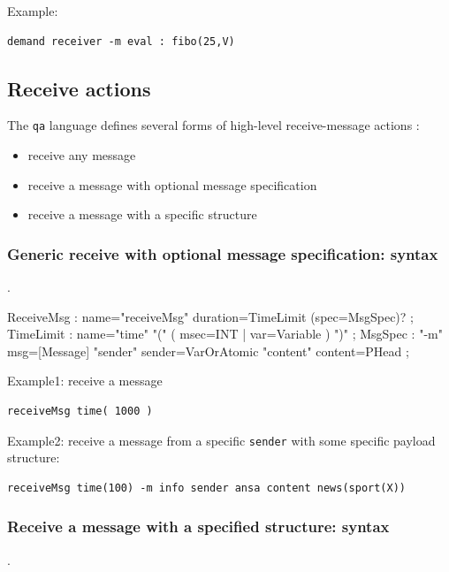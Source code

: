 \noindent Example:
\begin{Verbatim}[fontsize=\scriptsize, frame=single]
demand receiver -m eval : fibo(25,V)   
\end{Verbatim}

 
\subsection{Receive actions}
 
The \texttt{qa} language defines several forms of high-level receive-message actions  : 

\begin{itemize}
\item receive any message
\item receive a message with optional message specification
\item receive a message with a specific structure
\end{itemize}

\subsubsection{Generic receive with optional message specification: syntax}.
\begin{javacode}  
ReceiveMsg : name="receiveMsg" duration=TimeLimit (spec=MsgSpec)? ;
	TimeLimit : name="time" "(" ( msec=INT | var=Variable ) ")" ;
	MsgSpec   : "-m" msg=[Message]  "sender" sender=VarOrAtomic "content" content=PHead ; 
\end{javacode}

\noindent Example1: receive a message
\begin{Verbatim}[fontsize=\scriptsize, frame=single]
receiveMsg time( 1000 )   
\end{Verbatim}	

\noindent Example2: receive a message  from a specific \texttt{sender} with some specific payload structure:
 \begin{Verbatim}[fontsize=\scriptsize, frame=single]
receiveMsg time(100) -m info sender ansa content news(sport(X)) 
\end{Verbatim}

\subsubsection{Receive a message with a specified structure: syntax}.
 
